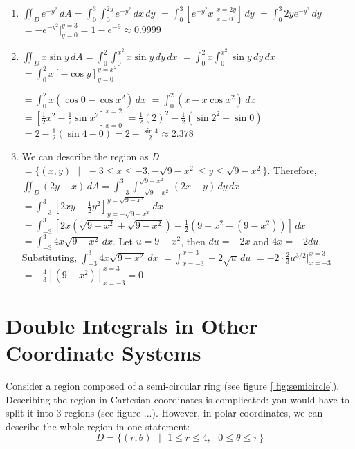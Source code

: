 \begin{Answer}[ref = non-rect]
\begin{enumerate}
    \item $\iint_{\textit{D}} e^{-y^2} \,dA = \int_0^3 \int_{0}^{2y} e^{-y^2}\,
    dx\,dy$ $= \int_0^3 \left[ e^{-y^2} x|_{x = 0}^{x = 2y} \right]\,dy$ $= 
    \int_0^3 2y e^{-y^2}\,dy$ $= -e^{-y^2}|_{y = 0}^{y = 3} = 1 - e^{-9} 
    \approx 0.9999$

    \item $\iint_{\textit{D}} x \sin{y}\,dA = \int_0^{2} \int_0^{x^2} x \sin{y}
    \,dy\,dx$ $= \int_0^{2} x \int_0^{x^2} \sin{y}\,dy\,dx$ $= \int_0^{2} x 
    \left[ -\cos{y} \right]_{y = 0}^{y = x^2}$ 
    
    $= \int_0^{2} x \left( \cos{0} -\cos{x^2} \right)\,dx$ $= \int_0^{2} \left(
    x - x\cos{x^2} \right)\,dx$ $= \left[ \frac{1}{2}x^2 - \frac{1}{2}\sin{x^2}
    \right]_{x = 0}^{x = 2}$ $= \frac{1}{2}(2)^2 - \frac{1}{2} \left( \sin{2^2}
    - \sin{0} \right)$ $= 2 - \frac{1}{2} \left( \sin{4} - 0 \right) = 2 - 
    \frac{\sin{4}}{2} \approx 2.378$

    \item We can describe the region as \textit{D} $= \{ (x, y) \text{ } | 
    \text{ } -3 \leq x \leq -3, -\sqrt{9 - x^2} \leq y \leq \sqrt{9 - x^2} \}$.
    Therefore, $\iint_{\textit{D}} \left(2y - x \right)\,dA = \int_{-3}^3 
    \int_{-\sqrt{9 - x^2}}^{\sqrt{9 - x^2}} \left( 2x - y \right)\,dy\,dx$ $= 
    \int_{-3}^3 \left[ 2xy - \frac{1}{2}y^2 \right]_{y = -\sqrt{9 - x^2}}^{y = 
    \sqrt{9 - x^2}}\,dx$ $= \int_{-3}^3 \left[ 2x \left( \sqrt{9 - x^2} + 
    \sqrt{9 - x^2} \right) - \frac{1}{2} \left( 9 - x^2 - \left(9 - x^2 \right) 
    \right) \right]\,dx$ $= \int_{-3}^3 4x\sqrt{9 - x^2}\,dx$. Let $u = 9 - 
    x^2$, then $du = -2x$ and $4x = -2du$. Substituting, $\int_{-3}^3 4x\sqrt{
    9 - x^2}\,dx$ $= \int_{x = -3}^{x = 3} -2\sqrt{u}\,du$ $= -2 \cdot 
    \frac{2}{3} u^{3/2}|_{x = -3}^{x = 3}$ $= -\frac{4}{3} \left[ \left( 9 - 
    x^2 \right) \right]_{x = -3}^{x = 3} = 0$
\end{enumerate}
\end{Answer}

\section{Double Integrals in Other Coordinate Systems}
Consider a region composed of a semi-circular ring (see figure \ref{
fig:semicircle}). Describing the region in Cartesian coordinates is 
complicated: you would have to split it into 3 regions (see figure ...). However, in polar coordinates, we can describe the whole region in one statement:
$$\textit{D} = \{(r, \theta)\text{ }|\text{ }1 \leq r \leq 4,\text{ }0 \leq 
\theta \leq \pi\}$$

